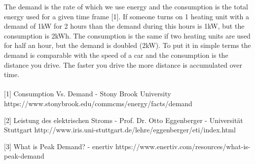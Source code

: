 The demand is the rate of which we use energy and the consumption is the total energy used for a given time frame [1]. If someone turns on 1 heating unit with a demand of 1kW for 2 hours than the demand during this hours is 1kW, but the consumption is 2kWh. The consumption is the same if two heating units are used for half an hour, but the demand is doubled (2kW). To put it in simple terms the demand is comparable with the speed of a car and the consumption is the distance you drive. The faster you drive the more distance is accumulated over time.\\\\ %


[1] Consumption Vs. Demand - Stony Brook University https://www.stonybrook.edu/commcms/energy/facts/demand

[2] Leistung des elektrischen Stroms - Prof. Dr. Otto Eggenberger - Universität Stuttgart 
http://www.iris.uni-stuttgart.de/lehre/eggenberger/eti/index.html

[3] What is Peak Demand? - enertiv https://www.enertiv.com/resources/what-is-peak-demand


